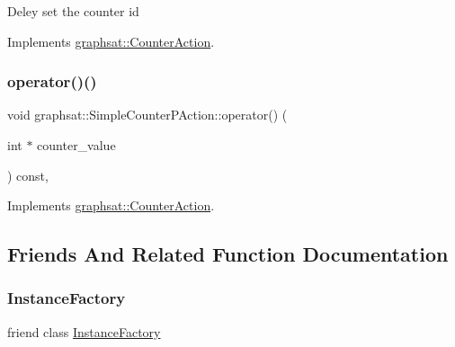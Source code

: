 Deley set the counter id 

Implements \mbox{\hyperlink{classgraphsat_1_1_counter_action_a09e8a5779f0ae70ea07e8974d93edf2e}{graphsat\+::\+Counter\+Action}}.

\mbox{\label{classgraphsat_1_1_simple_counter_p_action_af73621e7e23c0da32f3cd957400fba84}} 
\subsubsection{\texorpdfstring{operator()()}{operator()()}}
{\footnotesize\ttfamily void graphsat\+::\+Simple\+Counter\+P\+Action\+::operator() (\begin{DoxyParamCaption}\item[{int $\ast$}]{counter\+\_\+value }\end{DoxyParamCaption}) const\hspace{0.3cm}{\ttfamily [inline]}, {\ttfamily [virtual]}}



Implements \mbox{\hyperlink{classgraphsat_1_1_counter_action_ac21660dc667a4abca69fdda313c6708c}{graphsat\+::\+Counter\+Action}}.



\subsection{Friends And Related Function Documentation}
\mbox{\label{classgraphsat_1_1_simple_counter_p_action_ad4b3c25c041701ae56dc1e78df779d2f}} 
\subsubsection{\texorpdfstring{InstanceFactory}{InstanceFactory}}
{\footnotesize\ttfamily friend class \mbox{\hyperlink{classgraphsat_1_1_instance_factory}{Instance\+Factory}}\hspace{0.3cm}{\ttfamily [friend]}}




